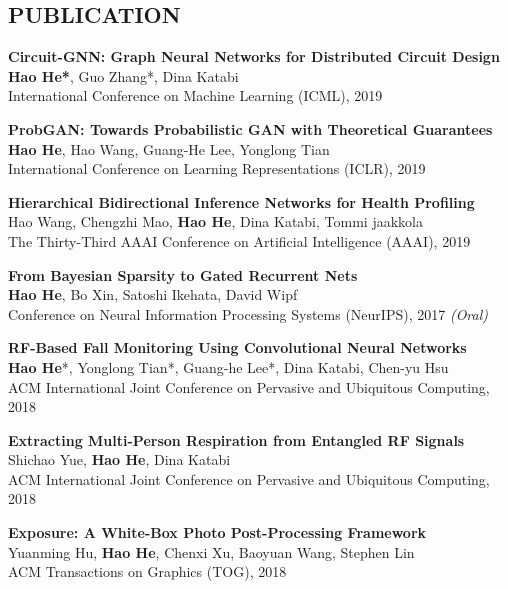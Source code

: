 \documentclass[margin]{res}
\begin{document}
\begin{resume}
\section{PUBLICATION}
\textbf{Circuit-GNN: Graph Neural Networks for Distributed Circuit Design}\\
\textbf{Hao He*}, Guo Zhang*, Dina Katabi\\
International Conference on Machine Learning (ICML), 2019

\textbf{ProbGAN: Towards Probabilistic GAN with Theoretical Guarantees}\\
\textbf{Hao He}, Hao Wang, Guang-He Lee, Yonglong Tian\\
International Conference on Learning Representations (ICLR), 2019

\textbf{Hierarchical Bidirectional Inference Networks for Health Profiling}\\
Hao Wang, Chengzhi Mao, \textbf{Hao He}, Dina Katabi, Tommi jaakkola\\
The Thirty-Third AAAI Conference on Artificial Intelligence (AAAI), 2019

\textbf{From Bayesian Sparsity to Gated Recurrent Nets}\\
\textbf{Hao He}, Bo Xin, Satoshi Ikehata, David Wipf\\
Conference on Neural Information Processing Systems (NeurIPS), 2017 \emph{(Oral)}

\textbf{RF-Based Fall Monitoring Using Convolutional Neural Networks}\\
\textbf{Hao He}*, Yonglong Tian*, Guang-he Lee*, Dina Katabi, Chen-yu Hsu\\
ACM International Joint Conference on Pervasive and Ubiquitous Computing, 2018

\textbf{Extracting Multi-Person Respiration from Entangled RF Signals}\\
Shichao Yue, \textbf{Hao He}, Dina Katabi \\
ACM International Joint Conference on Pervasive and Ubiquitous Computing, 2018

\textbf{Exposure: A White-Box Photo Post-Processing Framework}\\
Yuanming Hu, \textbf{Hao He}, Chenxi Xu, Baoyuan Wang, Stephen Lin\\
ACM Transactions on Graphics (TOG), 2018


\end{resume}
\end{document}
